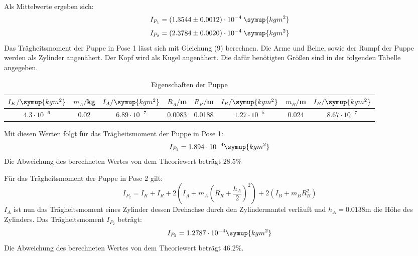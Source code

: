 Als Mittelwerte ergeben sich:
\begin{equation}
  I_{P_1} = (1.3544 \pm 0.0012)\cdot 10^{-4}\: \symup{kgm^2}
\end{equation}
\begin{equation}
  I_{P_2} = (2.3784 \pm 0.0020)\cdot 10^{-4}\: \symup{kgm^2}
\end{equation}
Das Trägheitsmoment der Puppe in Pose 1 lässt sich mit Gleichung (9)
berechnen. Die Arme und Beine, sowie der Rumpf der Puppe werden als Zylinder angenähert.
Der Kopf wird als Kugel angenähert.
Die dafür benötigten Größen sind in der folgenden Tabelle angegeben.
\begin{table}[H]
  \centering
  \caption{Eigenschaften der Puppe}
  \label{tab:Eigenschaften der Puppe}
  \begin{tabular}{c c c c c c c c}
    \toprule
    $I_K/ \symup{kgm^2}$ & $m_A /$kg & $I_A/\symup{kgm^2}$ & $R_A/$m & $R_R/$m & $I_R/\symup{kgm^2}$ & $m_B/$m & $I_B/\symup{kgm^2}$  \\
    \midrule
    $4.3\cdot 10^{-6}$ & 0.02 & $6.89\cdot 10^{-7}$ & 0.0083 & 0.0188 & $1.27\cdot 10^{-5}$ & 0.024 & $8.67\cdot 10^{-7}$ \\
    \bottomrule
  \end{tabular}
\end{table}
Mit diesen Werten folgt für das Trägheitsmoment der Puppe in Pose 1:
\begin{equation}
I_{P_1} = 1.894 \cdot 10^{-4} \symup{kgm^2}
\end{equation}
Die Abweichung des berechneten Wertes von dem Theoriewert beträgt $28.5\%$

Für das Trägheitsmoment der Puppe in Pose 2 gilt:
\begin{equation}
  I_{P_2} = I_K + I_R + 2(I_A + m_A(R_R + \frac{h_A}{2})^2) + 2(I_B + m_B R_B^2)
\end{equation}
$I_A$ ist nun das Trägheitsmoment eines Zylinder dessen Drehachse durch den Zylindermantel
verläuft und $h_A= 0.0138$m die Höhe des Zylinders.
Das Trägheitsmoment $I_{P_2}$ beträgt:
\begin{equation}
  I_{P_2} = 1.2787 \cdot 10^{-4} \symup{kgm^2}
\end{equation}
Die Abweichung des berechneten Wertes von dem Theoriewert beträgt $46.2 \%$.
